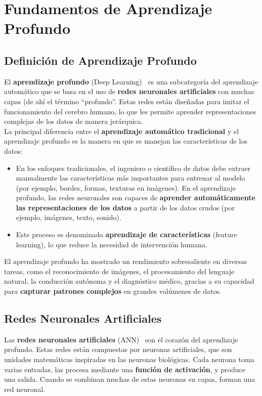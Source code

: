 \chapter{Fundamentos de Aprendizaje Profundo}\label{ch:fundamentos-de-aprendizaje-profundo}
\section{Definición de Aprendizaje Profundo}\label{sec:definicion-de-aprendizaje-profundo}
El \textbf{aprendizaje profundo} (Deep Learning)~\cite{weidman_deep_2019} es una subcategoría del aprendizaje
automático que se basa en el uso de \textbf{redes neuronales artificiales} con muchas capas (de ahí el término
``profundo''.
Estas redes están diseñadas para imitar el funcionamiento del cerebro humano, lo que les permite aprender
representaciones complejas de los datos de manera jerárquica. \\[2pt]

La principal diferencia entre el \textbf{aprendizaje automático tradicional} y el aprendizaje profundo es la manera en
que se manejan las características de los datos:
\begin{itemize}
    \item En los enfoques tradicionales, el ingeniero o científico de datos debe extraer manualmente las
características más importantes para entrenar al modelo (por ejemplo, bordes, formas, texturas en imágenes).
En el aprendizaje profundo, las redes neuronales son capaces de
\textbf{aprender automáticamente las representaciones de los datos} a partir de los datos crudos (por ejemplo,
imágenes, texto, sonido).
    \item Este proceso es denominado \textbf{aprendizaje de características} (feature learning), lo que reduce la
necesidad de intervención humana.
\end{itemize}

El aprendizaje profundo ha mostrado un rendimiento sobresaliente en diversas tareas, como el reconocimiento de
imágenes, el procesamiento del lenguaje natural, la conducción autónoma y el diagnóstico médico, gracias a su capacidad
para \textbf{capturar patrones complejos} en grandes volúmenes de datos.

\section{Redes Neuronales Artificiales}\label{sec:redes-neuronales-artificiales}
Las \textbf{redes neuronales artificiales} (ANN)~\cite{sydenham_handbook_2005} son el corazón del aprendizaje profundo.
Estas redes están compuestas por neuronas artificiales, que son unidades matemáticas inspiradas en las neuronas
biológicas.
Cada neurona toma varias entradas, las procesa mediante una \textbf{función de activación}, y produce una salida.
Cuando se combinan muchas de estas neuronas en capas, forman una red neuronal.

